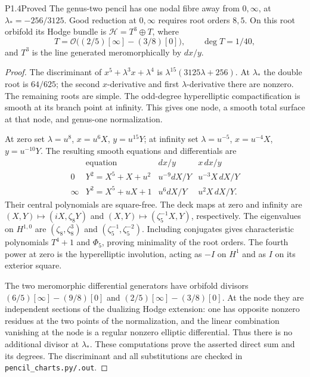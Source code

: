 \begin{statement}{P1.4}{Proved}
The genus-two pencil has one nodal fibre away from $0,\infty$, at
$\lambda_*=-256/3125$.  Good reduction at $0,\infty$ requires root
orders $8,5$.  On this root orbifold its Hodge bundle is
$\mathcal H=T^3\oplus T$, where
\[
T=\mathcal O\bigl((2/5)[\infty]-(3/8)[0]\bigr),\qquad
\deg T=1/40,
\]
and $T^3$ is the line generated meromorphically by $dx/y$.
\end{statement}
\begin{proof}
The discriminant of $x^5+\lambda^3x+\lambda^4$ is
$\lambda^{15}(3125\lambda+256)$.
At $\lambda_*$ the double root is $64/625$;
the second $x$-derivative and first $\lambda$-derivative there are
nonzero.  The remaining roots are simple.  The odd-degree
hyperelliptic compactification is smooth at its branch point at
infinity.  This gives one node, a smooth total surface at that node,
and genus-one normalization.

At zero set $\lambda=u^8$, $x=u^6X$, $y=u^{15}Y$; at infinity set
$\lambda=u^{-5}$, $x=u^{-4}X$, $y=u^{-10}Y$.
The resulting smooth equations and differentials are
\[
\begin{array}{c|c|c|c}
 &\text{equation}&dx/y&x\,dx/y\\\hline
0&Y^2=X^5+X+u^2&u^{-9}dX/Y&u^{-3}X\,dX/Y\\
\infty&Y^2=X^5+uX+1&u^6dX/Y&u^2X\,dX/Y.
\end{array}
\]
Their central polynomials are square-free.  The deck maps at zero and
infinity are $(X,Y)\mapsto(iX,\zeta_8Y)$ and
$(X,Y)\mapsto(\zeta_5^{-1}X,Y)$, respectively.
The eigenvalues on $H^{1,0}$ are $(\zeta_8,\zeta_8^3)$ and
$(\zeta_5^{-1},\zeta_5^{-2})$.  Including conjugates gives characteristic
polynomials $T^4+1$ and $\Phi_5$, proving minimality of the root orders.
The fourth power at zero is the hyperelliptic involution, acting as
$-I$ on $H^1$ and as $I$ on its exterior square.

The two meromorphic differential generators have orbifold divisors
$(6/5)[\infty]-(9/8)[0]$ and
$(2/5)[\infty]-(3/8)[0]$.
At the node they are independent sections of the dualizing Hodge
extension: one has opposite nonzero residues at the two points of the
normalization, and the linear combination vanishing at the node is a
regular nonzero elliptic differential.  Thus there is no additional
divisor at $\lambda_*$.  These computations prove the asserted direct
sum and its degrees.  The discriminant and all substitutions are
checked in \texttt{pencil\_charts.py/.out}.
\end{proof}

